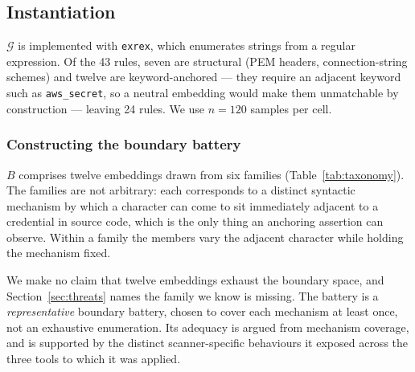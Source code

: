 \documentclass[pdflatex,sn-basic]{sn-jnl}
\begin{document}
\subsection{Instantiation}

$\mathcal{G}$ is implemented with \texttt{exrex}, which enumerates strings from a regular expression. Of the 43 rules, seven are structural (PEM headers, connection-string schemes) and twelve are keyword-anchored --- they require an adjacent keyword such as \texttt{aws\_secret}, so a neutral embedding would make them unmatchable by construction --- leaving 24 rules. We use $n=120$ samples per cell.

\subsubsection*{Constructing the boundary battery}

$B$ comprises twelve embeddings drawn from six families (Table~\ref{tab:taxonomy}). The families are not arbitrary: each corresponds to a distinct syntactic mechanism by which a character can come to sit immediately adjacent to a credential in source code, which is the only thing an anchoring assertion can observe. Within a family the members vary the adjacent character while holding the mechanism fixed.

We make no claim that twelve embeddings exhaust the boundary space, and Section~\ref{sec:threats} names the family we know is missing. The battery is a \emph{representative} boundary battery, chosen to cover each mechanism at least once, not an exhaustive enumeration. Its adequacy is argued from mechanism coverage, and is supported by the distinct scanner-specific behaviours it exposed across the three tools to which it was applied.
\end{document}
